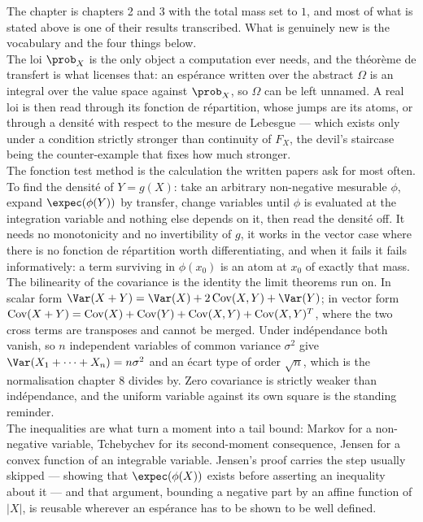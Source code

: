\begin{conclusion}
  The chapter is chapters 2 and 3 with the total mass set to $1$, and most of
  what is stated above is one of their results transcribed. What is genuinely
  new is the vocabulary and the four things below.\\

  The loi $\prob_{X}$ is the only object a computation ever needs, and the
  théorème de transfert is what licenses that: an espérance written over the
  abstract $\Omega$ is an integral over the value space against $\prob_{X}$, so
  $\Omega$ can be left unnamed. A real loi is then read through its fonction de
  répartition, whose jumps are its atoms, or through a densité with respect to
  the mesure de Lebesgue --- which exists only under a condition strictly
  stronger than continuity of $F_{X}$, the devil's staircase being the
  counter-example that fixes how much stronger.\\

  The fonction test method is the calculation the written papers ask for most
  often. To find the densité of $Y = g(X)$: take an arbitrary non-negative
  mesurable $\phi$, expand $\expec(\phi(Y))$ by transfer, change variables
  until $\phi$ is evaluated at the integration variable and nothing else depends
  on it, then read the densité off. It needs no monotonicity and no
  invertibility of $g$, it works in the vector case where there is no fonction de
  répartition worth differentiating, and when it fails it fails informatively: a
  term surviving in $\phi(x_{0})$ is an atom at $x_{0}$ of exactly that mass.\\

  The bilinearity of the covariance is the identity the limit theorems run on.
  In scalar form $\Var(X+Y) = \Var(X) + 2\Cov(X,Y) + \Var(Y)$; in vector form
  $\operatorname{Cov}(X+Y) = \operatorname{Cov}(X) + \operatorname{Cov}(Y) + \operatorname{Cov}(X,Y) + \operatorname{Cov}(X,Y)^{T}$, where the two
  cross terms are transposes and cannot be merged. Under indépendance both
  vanish, so $n$ independent variables of common variance $\sigma^{2}$ give
  $\Var(X_{1}+\dots+X_{n}) = n\sigma^{2}$ and an écart type of order
  $\sqrt{n}$, which is the normalisation chapter 8 divides by. Zero covariance
  is strictly weaker than indépendance, and the uniform variable against its own
  square is the standing reminder.\\

  The inequalities are what turn a moment into a tail bound: Markov for a
  non-negative variable, Tchebychev for its second-moment consequence, Jensen
  for a convex function of an integrable variable. Jensen's proof carries the
  step usually skipped --- showing that $\expec(\phi(X))$ exists before asserting
  an inequality about it --- and that argument, bounding a negative part by an
  affine function of $|X|$, is reusable wherever an espérance has to be shown
  to be well defined.
\end{conclusion}
